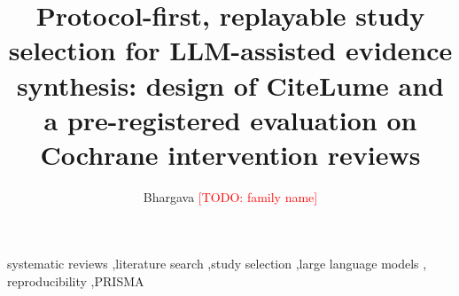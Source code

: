 \documentclass[preprint,12pt,authoryear]{elsarticle}
\newcommand{\TODO}[1]{\textcolor{red}{[TODO: #1]}}
\newcommand{\tool}{CiteLume}
\begin{document}
\begin{frontmatter}

\title{Protocol-first, replayable study selection for LLM-assisted evidence synthesis:
design of \tool{} and a pre-registered evaluation on Cochrane intervention reviews}

\author[aff1]{Bhargava \TODO{family name}}
\ead{\TODO{e-mail}}
\address[aff1]{\TODO{affiliation, or ``Independent researcher'', city, country}}



\begin{keyword}
systematic reviews \sep literature search \sep study selection \sep large language models \sep
reproducibility \sep PRISMA
\end{keyword}

\end{frontmatter}









\end{document}
